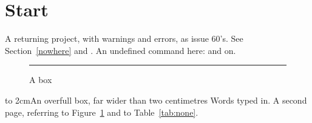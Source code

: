 \documentclass{article}
\begin{document}
\section{Start}
A returning project, with warnings and errors, as issue 60's.
See Section~\ref{nowhere} and \cite{nobody}.
An undefined command here: \nosuchcommand{} and on.
\begin{figure}[h]\centering\rule{2cm}{1cm}\caption{A box}\label{fig}\end{figure}
\hbox to 2cm{An overfull box, far wider than two centimetres}
Words typed in.
\newpage
A second page, referring to Figure~\ref{fig} and to Table~\ref{tab:none}.
\end{document}
